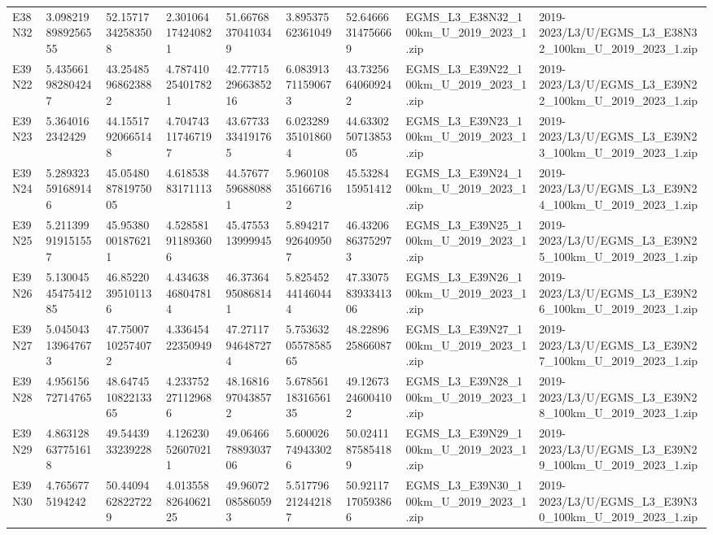 \begin{landscape}
\begin{longtable}{lllllllll}
E38N32 & 3.0982198989256555 & 52.15717342583508 & 2.301064174240821 & 51.66768370410349 & 3.89537562361049 & 52.64666314756669 & EGMS\_L3\_E38N32\_100km\_U\_2019\_2023\_1.zip & 2019-2023/L3/U/EGMS\_L3\_E38N32\_100km\_U\_2019\_2023\_1.zip \\
E39N22 & 5.435661982804247 & 43.25485968623882 & 4.787410254017821 & 42.777152966385216 & 6.083913711590673 & 43.73256640609242 & EGMS\_L3\_E39N22\_100km\_U\_2019\_2023\_1.zip & 2019-2023/L3/U/EGMS\_L3\_E39N22\_100km\_U\_2019\_2023\_1.zip \\
E39N23 & 5.3640162342429 & 44.15517920665148 & 4.704743117467197 & 43.67733334191765 & 6.023289351018604 & 44.633025071385305 & EGMS\_L3\_E39N23\_100km\_U\_2019\_2023\_1.zip & 2019-2023/L3/U/EGMS\_L3\_E39N23\_100km\_U\_2019\_2023\_1.zip \\
E39N24 & 5.289323591689146 & 45.054808781975005 & 4.61853883171113 & 44.57677596880881 & 5.960108351667162 & 45.5328415951412 & EGMS\_L3\_E39N24\_100km\_U\_2019\_2023\_1.zip & 2019-2023/L3/U/EGMS\_L3\_E39N24\_100km\_U\_2019\_2023\_1.zip \\
E39N25 & 5.211399919151557 & 45.95380001876211 & 4.528581911893606 & 45.4755313999945 & 5.894217926409507 & 46.43206863752973 & EGMS\_L3\_E39N25\_100km\_U\_2019\_2023\_1.zip & 2019-2023/L3/U/EGMS\_L3\_E39N25\_100km\_U\_2019\_2023\_1.zip \\
E39N26 & 5.1300454547541285 & 46.85220395101136 & 4.434638468047814 & 46.37364950868141 & 5.825452441460444 & 47.330758393341306 & EGMS\_L3\_E39N26\_100km\_U\_2019\_2023\_1.zip & 2019-2023/L3/U/EGMS\_L3\_E39N26\_100km\_U\_2019\_2023\_1.zip \\
E39N27 & 5.045043139647673 & 47.75007102574072 & 4.33645422350949 & 47.27117946487274 & 5.7536320557858565 & 48.2289625866087 & EGMS\_L3\_E39N27\_100km\_U\_2019\_2023\_1.zip & 2019-2023/L3/U/EGMS\_L3\_E39N27\_100km\_U\_2019\_2023\_1.zip \\
E39N28 & 4.95615672714765 & 48.647451082213365 & 4.233752271129686 & 48.16816970438572 & 5.6785611831656135 & 49.12673246004102 & EGMS\_L3\_E39N28\_100km\_U\_2019\_2023\_1.zip & 2019-2023/L3/U/EGMS\_L3\_E39N28\_100km\_U\_2019\_2023\_1.zip \\
E39N29 & 4.863128637751618 & 49.5443933239228 & 4.126230526070211 & 49.064667889303706 & 5.600026749433026 & 50.02411875854189 & EGMS\_L3\_E39N29\_100km\_U\_2019\_2023\_1.zip & 2019-2023/L3/U/EGMS\_L3\_E39N29\_100km\_U\_2019\_2023\_1.zip \\
E39N30 & 4.7656775194242 & 50.44094628227229 & 4.0135588264062125 & 49.96072085860593 & 5.517796212442187 & 50.92117170593866 & EGMS\_L3\_E39N30\_100km\_U\_2019\_2023\_1.zip & 2019-2023/L3/U/EGMS\_L3\_E39N30\_100km\_U\_2019\_2023\_1.zip \\

\end{longtable}
\end{landscape}
